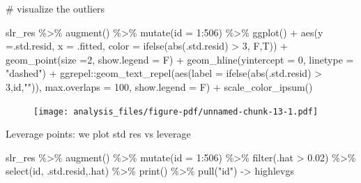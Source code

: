 \documentclass[
  letterpaper,
  DIV=11,
  numbers=noendperiod]{scrreprt}
\newenvironment{Shaded}{\begin{snugshade}}{\end{snugshade}}
\newcommand{\AttributeTok}[1]{\textcolor[rgb]{0.65,0.35,0.00}{#1}}
\newcommand{\CommentTok}[1]{\textcolor[rgb]{0.41,0.41,0.41}{#1}}
\newcommand{\DecValTok}[1]{\textcolor[rgb]{0.47,0.16,0.63}{#1}}
\newcommand{\FloatTok}[1]{\textcolor[rgb]{0.65,0.35,0.00}{#1}}
\newcommand{\FunctionTok}[1]{\textcolor[rgb]{0.02,0.16,0.49}{#1}}
\newcommand{\NormalTok}[1]{\textcolor[rgb]{0.33,0.33,0.33}{#1}}
\newcommand{\OtherTok}[1]{\textcolor[rgb]{0.85,0.12,0.09}{#1}}
\newcommand{\SpecialCharTok}[1]{\textcolor[rgb]{0.00,0.46,0.62}{#1}}
\newcommand{\StringTok}[1]{\textcolor[rgb]{0.00,0.50,0.00}{#1}}
\begin{document}
\begin{Shaded}
\begin{Highlighting}[]
\CommentTok{\# visualize the outliers}

\NormalTok{slr\_res }\SpecialCharTok{\%\textgreater{}\%} 
  \FunctionTok{augment}\NormalTok{() }\SpecialCharTok{\%\textgreater{}\%} 
  \FunctionTok{mutate}\NormalTok{(}\AttributeTok{id =} \DecValTok{1}\SpecialCharTok{:}\DecValTok{506}\NormalTok{) }\SpecialCharTok{\%\textgreater{}\%} 
  \FunctionTok{ggplot}\NormalTok{() }\SpecialCharTok{+} \FunctionTok{aes}\NormalTok{(}\AttributeTok{y =}\NormalTok{.std.resid, }\AttributeTok{x =}\NormalTok{ .fitted, }\AttributeTok{color =} \FunctionTok{ifelse}\NormalTok{(}\FunctionTok{abs}\NormalTok{(.std.resid) }\SpecialCharTok{\textgreater{}} \DecValTok{3}\NormalTok{, F,T)) }\SpecialCharTok{+} \FunctionTok{geom\_point}\NormalTok{(}\AttributeTok{size =}\DecValTok{2}\NormalTok{, }\AttributeTok{show.legend =}\NormalTok{ F) }\SpecialCharTok{+} \FunctionTok{geom\_hline}\NormalTok{(}\AttributeTok{yintercept =} \DecValTok{0}\NormalTok{, }\AttributeTok{linetype =} \StringTok{"dashed"}\NormalTok{) }\SpecialCharTok{+}
\NormalTok{  ggrepel}\SpecialCharTok{::}\FunctionTok{geom\_text\_repel}\NormalTok{(}\FunctionTok{aes}\NormalTok{(}\AttributeTok{label =} \FunctionTok{ifelse}\NormalTok{(}\FunctionTok{abs}\NormalTok{(.std.resid) }\SpecialCharTok{\textgreater{}} \DecValTok{3}\NormalTok{,id,}\StringTok{""}\NormalTok{)), }\AttributeTok{max.overlaps =} \DecValTok{100}\NormalTok{, }\AttributeTok{show.legend =}\NormalTok{ F) }\SpecialCharTok{+} \FunctionTok{scale\_color\_ipsum}\NormalTok{()}
\end{Highlighting}
\end{Shaded}

\begin{figure}[H]

{\centering \texttt{[image: analysis\_files/figure-pdf/unnamed-chunk-13-1.pdf]}

}

\end{figure}

Leverage points: we plot std res vs leverage

\begin{Shaded}
\begin{Highlighting}[]
\NormalTok{slr\_res }\SpecialCharTok{\%\textgreater{}\%} 
  \FunctionTok{augment}\NormalTok{() }\SpecialCharTok{\%\textgreater{}\%} \FunctionTok{mutate}\NormalTok{(}\AttributeTok{id =} \DecValTok{1}\SpecialCharTok{:}\DecValTok{506}\NormalTok{) }\SpecialCharTok{\%\textgreater{}\%} 
  \FunctionTok{filter}\NormalTok{(.hat }\SpecialCharTok{\textgreater{}} \FloatTok{0.02}\NormalTok{) }\SpecialCharTok{\%\textgreater{}\%} 
  \FunctionTok{select}\NormalTok{(id, .std.resid,.hat) }\SpecialCharTok{\%\textgreater{}\%} 
  \FunctionTok{print}\NormalTok{() }\SpecialCharTok{\%\textgreater{}\%} \FunctionTok{pull}\NormalTok{(}\StringTok{"id"}\NormalTok{) }\OtherTok{{-}\textgreater{}}\NormalTok{ highlevgs}
\end{Highlighting}
\end{Shaded}
\end{document}
